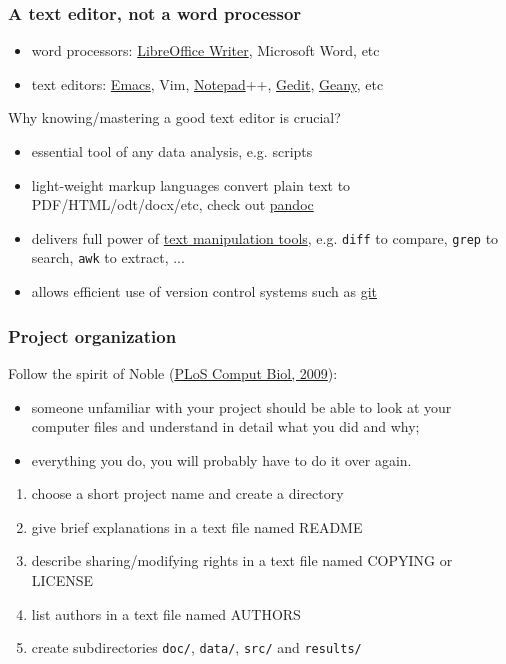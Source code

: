 \documentclass[c]{beamer} %
\begin{document}
\begin{frame}[fragile]
  \frametitle{A text editor, not a word processor}
  \begin{itemize}
  \item word processors: \href{https://www.libreoffice.org/discover/writer/}{LibreOffice Writer}, Microsoft Word, etc
  \item text editors: \href{https://www.gnu.org/software/emacs/}{Emacs}, Vim, \href{https://notepad-plus-plus.org/}{Notepad}++, \href{https://wiki.gnome.org/Apps/Gedit}{Gedit}, \href{http://www.geany.org/}{Geany}, etc
  \end{itemize}
  
  \bigskip
  \pause
  
  Why \alert{knowing/mastering a good text editor is crucial}?
  \begin{itemize}
  \item essential tool of any data analysis, e.g. scripts
  \item light-weight markup languages convert plain text to PDF/HTML/odt/docx/etc, check out \href{http://pandoc.org/}{pandoc}
  \item delivers full power of \href{http://www.ibm.com/developerworks/aix/library/au-unixtext/index.html}{text manipulation tools}, e.g. \verb+diff+ to compare, \verb+grep+ to search, \verb+awk+ to extract, ...
  \item allows efficient use of version control systems such as \href{http://www.git-scm.com/}{git}
  \end{itemize}
\end{frame}

\begin{frame}[fragile]
  \frametitle{Project organization}
  Follow the spirit of Noble (\href{http://dx.doi.org/10.1371/journal.pcbi.1000424}{PLoS Comput Biol, 2009}):
  \begin{itemize}
  \item someone unfamiliar with your project should be able to look at your computer files and understand in detail what you did and why;
  \item everything you do, you will probably have to do it over again.
  \end{itemize}
  
  \bigskip
  \pause
  
  \begin{enumerate}
  \item choose a short project name and create a directory
  \item give brief explanations in a text file named README
  \item describe sharing/modifying rights in a text file named COPYING or LICENSE
  \item list authors in a text file named AUTHORS
  \item create subdirectories \verb+doc/+, \verb+data/+, \verb+src/+ and \verb+results/+
  \end{enumerate}
\end{frame}
\end{document}
